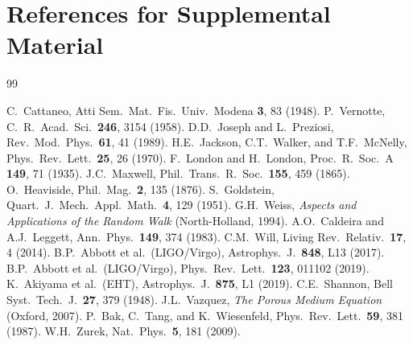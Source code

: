 \documentclass[reprint]{revtex4-2}
\begin{document}
\section*{References for Supplemental Material}

\begin{thebibliography}{99}

 C.~Cattaneo, Atti Sem.\ Mat.\ Fis.\ Univ.\ Modena \textbf{3}, 83 (1948).
 P.~Vernotte, C.\ R.\ Acad.\ Sci.\ \textbf{246}, 3154 (1958).
 D.D.\ Joseph and L.\ Preziosi, Rev.\ Mod.\ Phys.\ \textbf{61}, 41 (1989).
 H.E.\ Jackson, C.T.\ Walker, and T.F.\ McNelly, Phys.\ Rev.\ Lett.\ \textbf{25}, 26 (1970).
 F.\ London and H.\ London, Proc.\ R.\ Soc.\ A \textbf{149}, 71 (1935).
 J.C.\ Maxwell, Phil.\ Trans.\ R.\ Soc.\ \textbf{155}, 459 (1865).
 O.\ Heaviside, Phil.\ Mag.\ \textbf{2}, 135 (1876).
 S.~Goldstein, Quart.\ J.\ Mech.\ Appl.\ Math.\ \textbf{4}, 129 (1951).
 G.H.\ Weiss, \emph{Aspects and Applications of the Random Walk} (North-Holland, 1994).
 A.O.\ Caldeira and A.J.\ Leggett, Ann.\ Phys.\ \textbf{149}, 374 (1983).
 C.M.\ Will, Living Rev.\ Relativ.\ \textbf{17}, 4 (2014).
 B.P.\ Abbott et al.\ (LIGO/Virgo), Astrophys.\ J.\ \textbf{848}, L13 (2017).
 B.P.\ Abbott et al.\ (LIGO/Virgo), Phys.\ Rev.\ Lett.\ \textbf{123}, 011102 (2019).
 K.~Akiyama et al.\ (EHT), Astrophys.\ J.\ \textbf{875}, L1 (2019).
 C.E.\ Shannon, Bell Syst.\ Tech.\ J.\ \textbf{27}, 379 (1948).
 J.L.\ Vazquez, \emph{The Porous Medium Equation} (Oxford, 2007).
 P.~Bak, C.~Tang, and K.~Wiesenfeld, Phys.\ Rev.\ Lett.\ \textbf{59}, 381 (1987).
 W.H.\ Zurek, Nat.\ Phys.\ \textbf{5}, 181 (2009).
\end{thebibliography}
\end{document}
